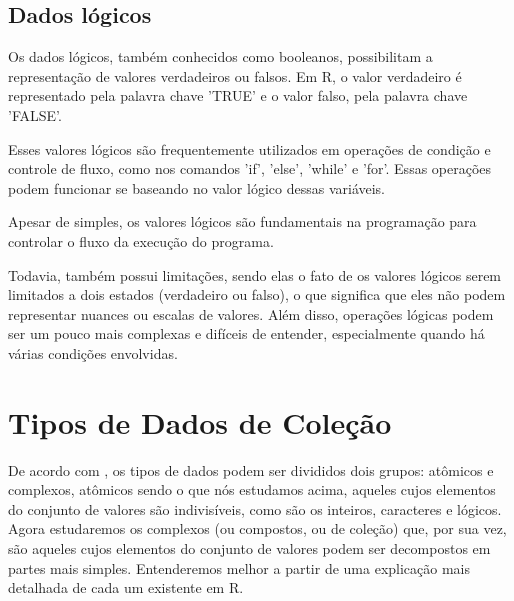    \subsection{Dados lógicos}
    	Os dados lógicos, também conhecidos como booleanos, possibilitam a representação de valores verdadeiros ou falsos. Em R, o valor verdadeiro é representado pela palavra chave 'TRUE' e o valor falso, pela palavra chave 'FALSE'.\par 
    	Esses valores lógicos são frequentemente utilizados em operações de condição e controle de fluxo, como nos comandos 'if', 'else', 'while' e 'for'. Essas operações podem funcionar se baseando no valor lógico dessas variáveis.\par 
    	Apesar de simples, os valores lógicos são fundamentais na programação para controlar o fluxo da execução do programa.\par 
    	Todavia, também possui limitações, sendo elas o fato de os valores lógicos serem limitados a dois estados (verdadeiro ou falso), o que significa que eles não podem representar nuances ou escalas de valores. Além disso, operações lógicas podem ser um pouco mais complexas e difíceis de entender, especialmente quando há várias condições envolvidas.
    	
    	

    \section{Tipos de Dados de Cole\c{c}\~{a}o}
    	De acordo com \cite{Laureano2008}, os tipos de dados podem ser divididos dois grupos: atômicos e complexos, atômicos sendo o que nós estudamos acima, aqueles cujos elementos do conjunto de valores são indivisíveis, como são os inteiros, caracteres e lógicos. Agora estudaremos os complexos (ou compostos, ou de coleção) que, por sua vez, são aqueles cujos elementos do conjunto de valores podem ser decompostos em partes mais simples. Entenderemos melhor a partir de uma explicação mais detalhada de cada um existente em R.
    	
